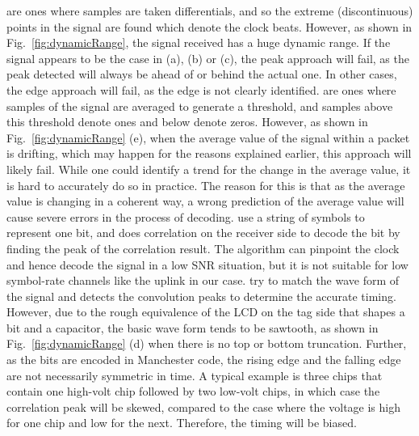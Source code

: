 \vskip 0.05in are ones where samples are taken differentials, and so the extreme (discontinuous) points in the signal are found which denote the clock beats. However, as shown in Fig.~\ref{fig:dynamicRange}, the signal received has a huge dynamic range. If the signal appears to be the case in (a), (b) or (c), the peak approach will fail, as the peak detected will always be ahead of or behind the actual one. In other cases, the edge approach will fail, as the edge is not clearly identified. 
\vskip 0.05in are ones where samples of the signal are averaged to generate a threshold, and samples above this threshold denote ones and below denote zeros. However, as shown in Fig.~\ref{fig:dynamicRange} (e), when the average value of the signal within a packet is drifting, which may happen for the reasons explained earlier, this approach will likely fail. While one could identify a trend for the change in the average value, it is hard to accurately do so in practice. The reason for this is that as the average value is changing in a coherent way, a wrong prediction of the average value will cause severe errors in the process of decoding.
\vskip 0.05in use a string of symbols to represent one bit, and does correlation on the receiver side to decode the bit by finding the peak of the correlation result. The algorithm can pinpoint the clock and hence decode the signal in a low SNR situation, but it is not suitable for low symbol-rate channels like the uplink in our case. 
\vskip 0.05in try to match the wave form of the signal and detects the convolution peaks to determine the accurate timing. However, due to the rough equivalence of the LCD on the tag side that shapes a bit and a capacitor, the basic wave form tends to be sawtooth, as shown in Fig.~\ref{fig:dynamicRange} (d) when there is no top or bottom truncation. Further, as the bits are encoded in Manchester code, the rising edge and the falling edge are not necessarily symmetric in time. A typical example is three chips that contain one high-volt chip followed by two low-volt chips, in which case the correlation peak will be skewed, compared to the case where the voltage is high for one chip and low for the next. Therefore, the timing will be biased.

